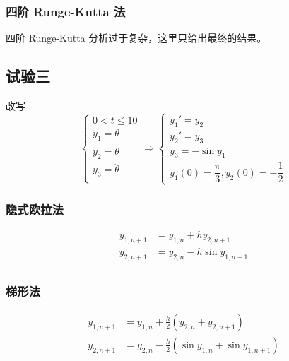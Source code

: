 \documentclass{article}
\begin{document}
\subsubsection{四阶 Runge-Kutta 法}
四阶 Runge-Kutta 分析过于复杂，这里只给出最终的结果。

\subsection{试验三}
改写
\begin{equation*}
    \begin{cases}
        0<t\le10\\
        y_1 = \theta\\
        y_2 = \dot{\theta}\\
        y_3 = \ddot{\theta}\\
    \end{cases}\Rightarrow
    \begin{cases}
        y_1'=y_2\\
        y_2'=y_3\\
        y_3=-\sin y_1\\
        y_1(0)=\dfrac{\pi}{3},y_2(0)=-\dfrac{1}{2}
    \end{cases}
\end{equation*}

\subsubsection{隐式欧拉法}
\begin{equation*}
    \begin{aligned}
        y_{1,n+1}&=y_{1,n}+hy_{2,n+1}\\
        y_{2,n+1}&=y_{2,n}-h\sin y_{1,n+1}\\
    \end{aligned}
\end{equation*}

\subsubsection{梯形法}
\begin{equation*}
    \begin{aligned}
        y_{1,n+1}&=y_{1,n}+\frac{h}{2}(y_{2,n}+y_{2,n+1})\\
        y_{2,n+1}&=y_{2,n}-\frac{h}{2}(\sin y_{1,n}+\sin y_{1,n+1})\\
    \end{aligned}
\end{equation*}
\end{document}
